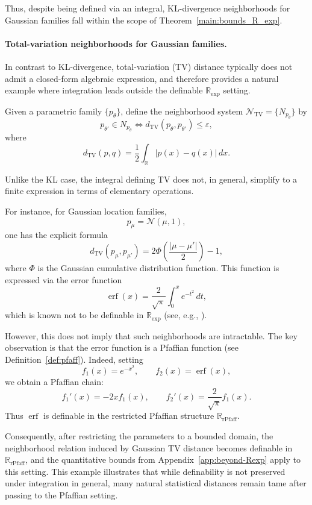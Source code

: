 \documentclass[11pt]{article}
\theoremstyle{plain}
\theoremstyle{definition}
\theoremstyle{remark}
\newcommand{\R}{\mathbb{R}}
\newcommand{\rPfaff}{\operatorname{rPfaff}}
\begin{document}
Thus, despite being defined via an integral, KL-divergence neighborhoods for
Gaussian families fall within the scope of
Theorem~\ref{main:bounds_R_exp}.

\paragraph{Total-variation neighborhoods for Gaussian families.}

In contrast to KL-divergence, total-variation (TV) distance typically does
not admit a closed-form algebraic expression, and therefore provides a
natural example where integration leads outside the definable
\(\R_{\exp}\) setting.

Given a parametric family \(\{p_\theta\}\), define the neighborhood system
\(\mathcal N_{\mathrm{TV}}=\{N_{p_\theta}\}\) by
\[
p_{\theta'}\in N_{p_\theta}
\iff
d_{\mathrm{TV}}(p_\theta,p_{\theta'}) \le \varepsilon,
\]
where
\[
d_{\mathrm{TV}}(p,q)
=
\frac{1}{2}\int_{\R} |p(x)-q(x)|\,dx.
\]

Unlike the KL case, the integral defining TV does not, in general,
simplify to a finite expression in terms of elementary operations.

For instance, for Gaussian location families,
\[
p_\mu = \mathcal N(\mu,1),
\]
one has the explicit formula
\[
d_{\mathrm{TV}}(p_\mu,p_{\mu'})
=
2\Phi\!\left(\frac{|\mu-\mu'|}{2}\right)-1,
\]
where \(\Phi\) is the Gaussian cumulative distribution function. This
function is expressed via the error function
\[
\operatorname{erf}(x)
=
\frac{2}{\sqrt{\pi}}\int_0^x e^{-t^2}\,dt,
\]
which is known not to be definable in \(\R_{\exp}\)
(see, e.g., \cite[Chapter~4.4]{piatkowski2019exponential}).

However, this does not imply that such neighborhoods are intractable.
The key observation is that the error function is a Pfaffian function
(see Definition~\ref{def:pfaff}). Indeed, setting
\[
f_1(x)=e^{-x^2},
\qquad
f_2(x)=\operatorname{erf}(x),
\]
we obtain a Pfaffian chain:
\[
f_1'(x)=-2x f_1(x),
\qquad
f_2'(x)=\frac{2}{\sqrt{\pi}} f_1(x).
\]
Thus \(\operatorname{erf}\) is definable in the restricted Pfaffian
structure \(\R_{\rPfaff}\).

Consequently, after restricting the parameters to a bounded domain,
the neighborhood relation induced by Gaussian TV distance becomes
definable in \(\R_{\rPfaff}\), and the quantitative bounds from
Appendix~\ref{app:beyond-Rexp} apply to this setting. This example
illustrates that while definability is not preserved under integration
in general, many natural statistical distances remain tame after
passing to the Pfaffian setting.
\end{document}
